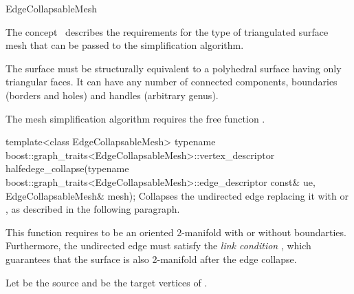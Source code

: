 
\begin{ccRefConcept}{EdgeCollapsableMesh}


\ccDefinition

The concept \ccRefName\ describes the requirements for the type of 
triangulated surface mesh that can be passed to the
simplification algorithm.

The surface must be structurally equivalent to a polyhedral surface
having only triangular faces. 
It can have any number of connected components, boundaries 
(borders and holes) and handles (arbitrary genus).

\ccRefines
{}


The mesh simplification algorithm requires the free function .


  \ccFunction
  {template<class EdgeCollapsableMesh>
  typename boost::graph_traits<EdgeCollapsableMesh>::vertex_descriptor
  halfedege_collapse(typename boost::graph_traits<EdgeCollapsableMesh>::edge_descriptor const& ue,
                             EdgeCollapsableMesh& mesh);}  
  {Collapses the undirected edge  replacing it with  or 
   , as described in the following paragraph.}

    

\ccPrecond This function requires  to be an oriented 2-manifold with or without boundarties. Furthermore, the undirected edge  must satisfy the {\em link condition} 
\cite{degn-tpec-98}, which guarantees that the surface is also 2-manifold after the edge collapse. 

\smallskip
Let  be the source and  be the target vertices of .


\end{ccRefConcept}
